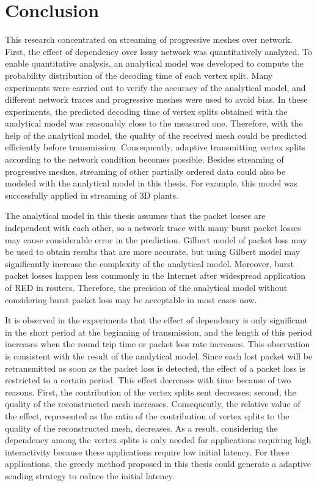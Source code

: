 \documentclass[11pt, a4paper]{report}
\begin{document}
\chapter{Conclusion}
\label{c:conclusion}
This research concentrated on streaming of progressive meshes over network. 
First, the effect of dependency over lossy network was quantitatively analyzed. 
To enable quantitative analysis, an analytical model was developed to compute 
the probability distribution of the decoding time of each vertex split. 
Many experiments were carried out to verify the accuracy of the analytical model, 
and different network traces and progressive meshes were used to avoid bias. 
In these experiments, the predicted decoding time of vertex splits obtained 
with the analytical model was reasonably close to the measured one. 
Therefore, with the help of the analytical model, 
the quality of the received mesh could be predicted efficiently before transmission.
Consequently, adaptive transmitting vertex splits according to the network condition
becomes possible. Besides streaming of progressive meshes, 
streaming of other partially ordered data could also be modeled
with the analytical model in this thesis. 
For example, this model was successfully applied in streaming of 3D plants.

The analytical model in this thesis assumes that the packet losses 
are independent with each other, 
so a network trace with many burst packet losses may cause considerable error in the prediction. 
Gilbert model of packet loss may be used to obtain results that are more accurate, 
but using Gilbert model may significantly increase the complexity of the analytical model. 
Moreover, burst packet losses happen less commonly in the Internet
after widespread application of RED in routers. 
Therefore, the precision of the analytical model
without considering burst packet loss may be acceptable in most cases now.

It is observed in the experiments that the effect of dependency
is only significant in the short period at the beginning of transmission, 
and the length of this period increases
when the round trip time or packet loss rate increases. 
This observation is consistent with the result of the analytical model. 
Since each lost packet will be retransmitted as soon as the packet loss is detected, 
the effect of a packet loss is restricted to a certain period. 
This effect decreases with time because of two reasons. 
First, the contribution of the vertex splits sent decreases; 
second, the quality of the reconstructed mesh increases. 
Consequently, the relative value of the effect, 
represented as the ratio of the contribution of vertex
splits to the quality of the reconstructed mesh, decreases.
As a result, considering the dependency among the vertex splits 
is only needed for applications requiring high interactivity
because these applications require low initial latency. 
For these applications, the greedy method proposed in this thesis
could generate a adaptive sending strategy to reduce the initial latency. 
\end{document}
